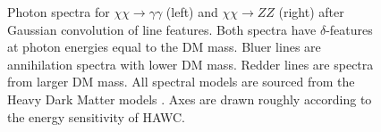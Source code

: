 \begin{figure}[h]
    \caption{Photon spectra for $\chi\chi \rightarrow \gamma\gamma$ (left) and $\chi\chi \rightarrow ZZ$ (right) after Gaussian convolution of line features. Both spectra have $\delta$-features at photon energies equal to the DM mass. Bluer lines are annihilation spectra with lower DM mass. Redder lines are spectra from larger DM mass. All spectral models are sourced from the Heavy Dark Matter models \cite{Rodd:HDM_spec}. Axes are drawn roughly according to the energy sensitivity of HAWC.}
    \label{fig:hdm_gamma_lines}
\end{figure}

